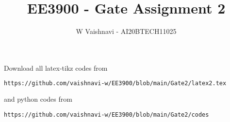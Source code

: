 \documentclass[journal,12pt,twocolumn]{IEEEtran}
\DeclareMathOperator*{\Res}{Res}
\begin{document}
\newcommand{\BEQA}{\begin{eqnarray}}
\newcommand{\EEQA}{\end{eqnarray}}
\newcommand{\define}{\stackrel{\triangle}{=}}

\raggedbottom
\setlength{\parindent}{0pt}
\providecommand{\mbf}{\mathbf}
\providecommand{\pr}[1]{\ensuremath{\Pr\left(#1\right)}}
\providecommand{\qfunc}[1]{\ensuremath{Q\left(#1\right)}}
\providecommand{\sbrak}[1]{\ensuremath{{}\left[#1\right]}}
\providecommand{\lsbrak}[1]{\ensuremath{{}\left[#1\right.}}
\providecommand{\rsbrak}[1]{\ensuremath{{}\left.#1\right]}}
\providecommand{\brak}[1]{\ensuremath{\left(#1\right)}}
\providecommand{\lbrak}[1]{\ensuremath{\left(#1\right.}}
\providecommand{\rbrak}[1]{\ensuremath{\left.#1\right)}}
\providecommand{\cbrak}[1]{\ensuremath{\left\{#1\right\}}}
\providecommand{\lcbrak}[1]{\ensuremath{\left\{#1\right.}}
\providecommand{\rcbrak}[1]{\ensuremath{\left.#1\right\}}}
\theoremstyle{remark}
\newtheorem{rem}{Remark}
\newtheorem*{remark}{Remark}
\newcommand{\sgn}{\mathop{\mathrm{sgn}}}
\providecommand{\abs}[1]{\vert#1\vert}
\providecommand{\res}[1]{\Res\displaylimits_{#1}} 
\providecommand{\norm}[1]{\lVert#1\rVert}
\providecommand{\mtx}[1]{\mathbf{#1}}
\providecommand{\mean}[1]{E[ #1 ]}
\providecommand{\fourier}{\overset{\mathcal{F}}{ \rightleftharpoons}}
\providecommand{\system}{\overset{\mathcal{H}}{ \longleftrightarrow}}
\newcommand{\solution}{\noindent \textbf{Solution: }}
\newcommand{\cosec}{\,\text{cosec}\,}
\providecommand{\dec}[2]{\ensuremath{\overset{#1}{\underset{#2}{\gtrless}}}}
\newcommand{\myvec}[1]{\ensuremath{\begin{pmatrix}#1\end{pmatrix}}}
\newcommand{\mydet}[1]{\ensuremath{\begin{vmatrix}#1\end{vmatrix}}}
\makeatletter
{}
\makeatother
\let\StandardTheFigure\thefigure
\let\vec\mathbf
\renewcommand{\thefigure}{\theproblem}
\def\putbox#1#2#3{\makebox[0in][l]{\makebox[#1][l]{}\raisebox{\baselineskip}[0in][0in]{\raisebox{#2}[0in][0in]{#3}}}}
     \def\rightbox#1{\makebox[0in][r]{#1}}
     \def\centbox#1{\makebox[0in]{#1}}
     \def\topbox#1{\raisebox{-\baselineskip}[0in][0in]{#1}}
     \def\midbox#1{\raisebox{-0.5\baselineskip}[0in][0in]{#1}}
\vspace{3cm}
\title{EE3900 - Gate Assignment 2}
\author{W Vaishnavi - AI20BTECH11025}
\maketitle
\newpage
\bigskip
\renewcommand{\thefigure}{\theenumi}
\renewcommand{\thetable}{\theenumi}
Download all latex-tikz codes from 
%
\begin{lstlisting}
https://github.com/vaishnavi-w/EE3900/blob/main/Gate2/latex2.tex
\end{lstlisting}
and python codes from 
%
\begin{lstlisting}
https://github.com/vaishnavi-w/EE3900/blob/main/Gate2/codes
\end{lstlisting}
\end{document}
